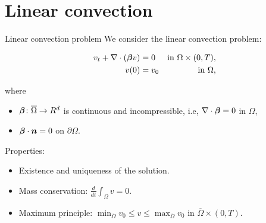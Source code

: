 
\begin{frame}[t,plain]
\titlepage
\end{frame}


\section{Linear convection}

\begin{frame}{Linear convection problem}
	We consider the linear convection problem:
	\begin{block}{}
		\vspace*{-1cm}
		\begin{subequations}
			\label{problema:conveccion}
			\begin{align}
				\label{eq:conveccion}
				v_t+\nabla\cdot(\boldsymbol{\beta} v)&=0&\text{in }\Omega\times(0,T),\\
				\label{ic:conveccion}
				v(0)&=v_0&\text{in }\Omega,
			\end{align}
		\end{subequations}
	\end{block}
	where
	\begin{itemize}
		\item $\boldsymbol{\beta}\colon\overline{\Omega}\to\relax R^d$ is continuous and \alert{incompressible}, i.e, $\nabla\cdot\boldsymbol{\beta}=0$ in $\Omega$,
		\item $\boldsymbol{\beta}\cdot\boldsymbol{n}=0$ on $\partial\Omega$.
	\end{itemize}
	
	\vspace*{0.3cm}
	Properties:
	\begin{itemize}
		\item \alert{Existence} and \alert{uniqueness} of the solution.
		\item \alert{Mass conservation}: $\frac{d}{dt}\int_\Omega v=0$.
		\item \alert{Maximum principle}: $\min_{\overline\Omega}{v_0}\le v\le\max_{\overline\Omega}{v_0}$ in $ \overline\Omega\times (0,T)$.
	\end{itemize}
	
\end{frame}

